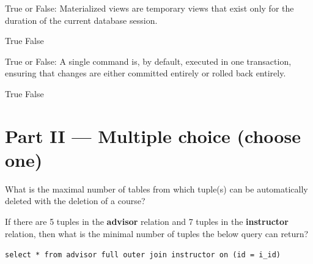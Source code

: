 \documentclass[12pt, addpoints]{exam}
\begin{document}
\begin{questions}
\begin{minipage}{\linewidth}
\question[2]
True or False: Materialized views are temporary views that exist only for the duration of the current database session.\par\vspace{0.5em}
\begin{checkboxes}
    \choice True
    \CorrectChoice False
\end{checkboxes}
\end{minipage}

\begin{minipage}{\linewidth}
\question[2]
True or False: A single command is, by default, executed in one transaction, ensuring that changes are either committed entirely or rolled back entirely.\par\vspace{0.5em}
\begin{checkboxes}
    \CorrectChoice True
    \choice False
\end{checkboxes}
\end{minipage}

\section*{Part II — Multiple choice (choose one)}

\begin{minipage}{\linewidth}
\question[3]
What is the maximal number of tables from which tuple(s) can be automatically deleted with the deletion of a course?\par\vspace{0.5em}
\begin{checkboxes}
\end{checkboxes}
\end{minipage}

\begin{minipage}{\linewidth}
\question[3]
If there are 5 tuples in the \textbf{advisor} relation and 7 tuples in the \textbf{instructor} relation, 
then what is the minimal number of tuples the below query can return?\par\vspace{0.5em}

\texttt{select * from advisor full outer join instructor on (id = i\_id)}\par\vspace{0.5em}


\end{minipage}
\end{questions}
\end{document}
